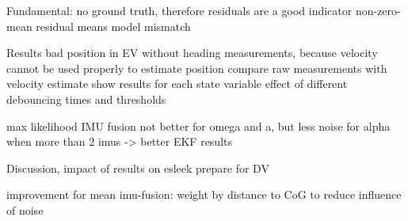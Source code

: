 Fundamental: no ground truth, therefore residuals are a good indicator
non-zero-mean residual means model mismatch~\cite[p.~158]{AlexanderWischnewski.2019}

Results
bad position in EV without heading measurements, because velocity cannot be used properly to estimate position
compare raw measurements with velocity estimate
show results for each state variable
effect of different debouncing times and thresholds

max likelihood IMU fusion not better for omega and a, but less noise for alpha when more than 2 imus -> better EKF results


Discussion, impact of results on esleek
prepare for DV

improvement for mean imu-fusion: weight by distance to CoG to reduce influence of noise
